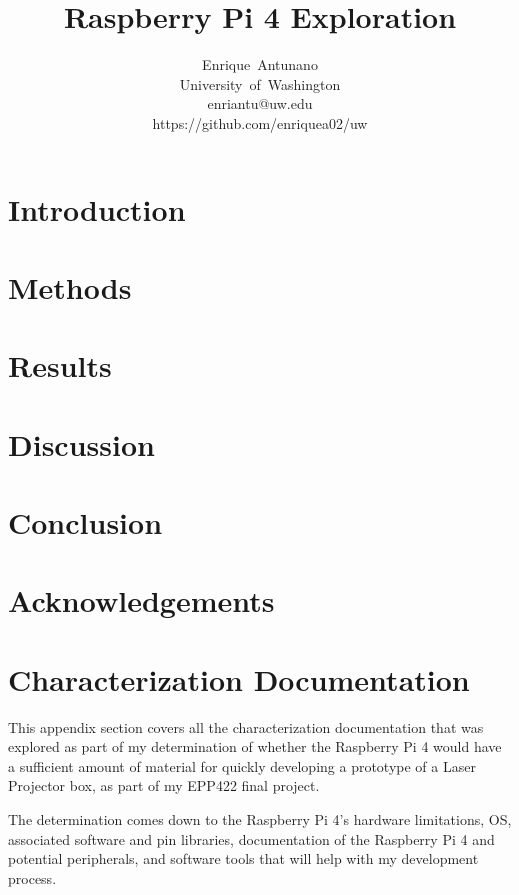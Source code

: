 \documentclass[journal]{IEEEtran}
\begin{document}
    \title{Raspberry Pi 4 Exploration}

    \author{Enrique~Antunano\\University~of~Washington\\enriantu@uw.edu\\https://github.com/enriquea02/uw}


    \maketitle

    \section{Introduction}
    \section{Methods}
    \section{Results}
    \section{Discussion}
    \section{Conclusion}
    \section{Acknowledgements}

    \appendices
    \section{Characterization Documentation}
    This appendix section covers all the characterization documentation that was explored as part of my determination of whether the Raspberry Pi 4 would have a sufficient amount of material for quickly developing a prototype of a
    Laser Projector box, as part of my EPP422 final project.
    
    The determination comes down to the Raspberry Pi 4's hardware limitations, OS, associated software and pin libraries, documentation of the Raspberry Pi 4 and potential peripherals, and software tools that 
    will help with my development process.
\end{document}
